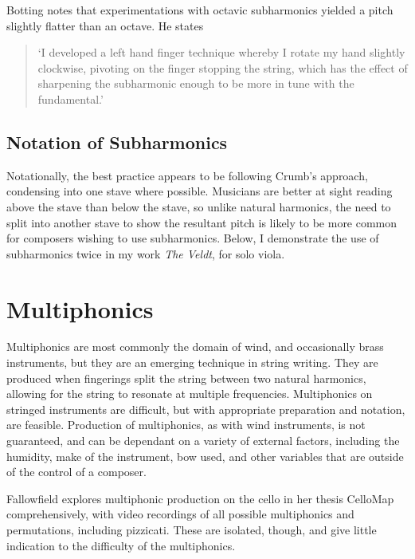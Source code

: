   Botting notes that experimentations with octavic subharmonics yielded a pitch slightly flatter than an octave. He states \begin{quotation}
    `I developed a left hand finger technique whereby I rotate my hand slightly clockwise, pivoting on the finger stopping the string, which has the effect of sharpening the subharmonic enough to be more in tune with the fundamental.'\autocite[111]{bottingDevelopingPersonalVocabulary2019}
\end{quotation}

\subsection{Notation of Subharmonics}
Notationally, the best practice appears to be following Crumb's approach, condensing into one stave where possible. Musicians are better at sight reading above the stave than below the stave, so unlike natural harmonics, the need to split into another stave to show the resultant pitch is likely to be more common for composers wishing to use subharmonics. Below, I demonstrate the use of subharmonics twice in my work \emph{The Veldt}, for solo viola.

\section{Multiphonics}
Multiphonics are most commonly the domain of wind, and occasionally brass instruments, but they are an emerging technique in string writing. They are produced when fingerings split the string between two natural harmonics, allowing for the string to resonate at multiple frequencies.
Multiphonics on stringed instruments are difficult, but with appropriate preparation and notation, are feasible. Production of multiphonics, as with wind instruments, is not guaranteed, and can be dependant on a variety of external factors, including the humidity, make of the instrument, bow used, and other variables that are outside of the control of a composer. 

Fallowfield explores multiphonic production on the cello in her thesis CelloMap comprehensively, with video recordings of all possible multiphonics and permutations, including pizzicati.\autocite{fallowfieldCelloMapHandbook2009} These are isolated, though, and give little indication to the difficulty of the multiphonics.



